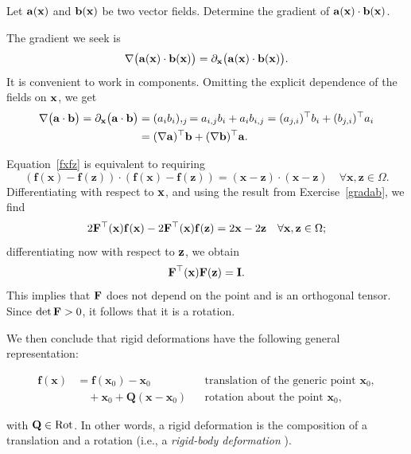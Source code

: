 \begin{exercise}\label{gradab}
	Let $\mathbf{a}(\mathbf{x})$ and $\mathbf{b}(\mathbf{x})$ be two vector fields. Determine the gradient of $\mathbf{a}(\mathbf{x})\cdot\mathbf{b}(\mathbf{x})$.
	
	\begin{svolgimento}
		The gradient we seek is
		\begin{equation}
			\nabla\big( \mathbf{a}(\mathbf{x})\cdot\mathbf{b}(\mathbf{x}) \big)=\partial_{\mathbf{x}}\big( \mathbf{a}(\mathbf{x})\cdot\mathbf{b}(\mathbf{x}) \big).
		\end{equation}
		It is convenient to work in components. Omitting the explicit dependence of the fields on $\mathbf{x}$, we get
		\begin{equation}
			\begin{aligned}
				\nabla\big( \mathbf{a}\cdot\mathbf{b}\big)=\partial_{\mathbf{x}}\big( \mathbf{a}\cdot\mathbf{b} \big)&=(a_i b_i),_{j}=a_{i,j}b_i+a_ib_{i,j}=(a_{j,i})^\top b_i+(b_{j,i})^\top a_i\\
				&=(\nabla\mathbf{a})^\top\mathbf{b}+(\nabla \mathbf{b})^\top\mathbf{a}.
			\end{aligned}
		\end{equation}
	\end{svolgimento}
	
\end{exercise}

Equation~\eqref{fxfz} is equivalent to requiring
\begin{equation}
	\left(\mathbf{f}(\mathbf{x})-\mathbf{f}(\mathbf{z})\right)\cdot\left(\mathbf{f}(\mathbf{x})-\mathbf{f}(\mathbf{z})\right)=(\mathbf{x}-\mathbf{z})\cdot(\mathbf{x}-\mathbf{z})\quad\forall\mathbf{x},\mathbf{z}\in\Omega.
\end{equation}
Differentiating with respect to $\mathbf{x}$, and using the result from Exercise~\ref{gradab}, we find
\begin{equation}
	2	\mathbf{F}^\top(\mathbf{x})\mathbf{f}(\mathbf{x})-2\mathbf{F}^\top(\mathbf{x})\mathbf{f}(\mathbf{z})=2\mathbf{x}-2\mathbf{z}  \quad\forall\mathbf{x},\mathbf{z}\in\Omega;
\end{equation}
differentiating now with respect to $\mathbf{z}$, we obtain
\begin{equation}
	\mathbf{F}^\top(\mathbf{x})\mathbf{F}(\mathbf{z})=\mathbf{I}.
\end{equation}
This implies that $\mathbf{F}$ does not depend on the point and is an orthogonal tensor. Since $\det\mathbf{F}>0$, it follows that it is a rotation.

We then conclude that rigid deformations have the following general representation:

\begin{definition}
	\begin{equation}
		\begin{aligned}
			\mathbf{f}(\mathbf{x}) &= \mathbf{f}(\mathbf{x}_0)-\mathbf{x}_0 &&\text{translation of the generic point }\mathbf{x}_0, \\
			&\quad+\mathbf{x}_0+\mathbf{Q}(\mathbf{x}-\mathbf{x}_0)&&\text{rotation about the point }\mathbf{x}_0,
		\end{aligned}
	\end{equation}
\end{definition}
with $\mathbf{Q} \in \operatorname{Rot}$.  
In other words, a rigid deformation is the composition of a translation and a rotation (i.e., a \textit{rigid-body deformation} ).





